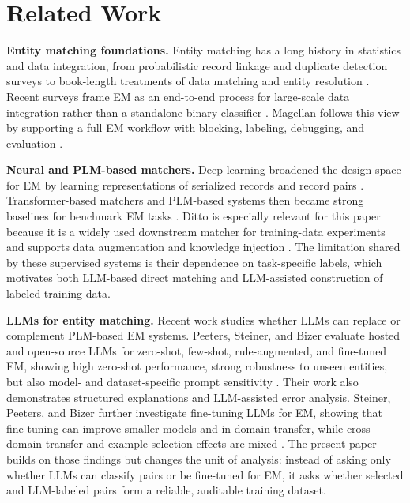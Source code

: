\section{Related Work}

\textbf{Entity matching foundations.} Entity matching has a long history in statistics and data integration, from probabilistic record linkage \cite{fellegi1969record} and duplicate detection surveys \cite{elmagarmid2007duplicate} to book-length treatments of data matching and entity resolution \cite{christen2012data,christophides2015webdata}. Recent surveys frame EM as an end-to-end process for large-scale data integration rather than a standalone binary classifier \cite{christophides2020overview}. Magellan follows this view by supporting a full EM workflow with blocking, labeling, debugging, and evaluation \cite{konda2016magellan}.

\textbf{Neural and PLM-based matchers.} Deep learning broadened the design space for EM by learning representations of serialized records and record pairs \cite{mudgal2018deep,barlaug2021survey}. Transformer-based matchers and PLM-based systems then became strong baselines for benchmark EM tasks \cite{brunner2020transformer,li2020ditto}. Ditto is especially relevant for this paper because it is a widely used downstream matcher for training-data experiments and supports data augmentation and knowledge injection \cite{li2020ditto}. The limitation shared by these supervised systems is their dependence on task-specific labels, which motivates both LLM-based direct matching and LLM-assisted construction of labeled training data.

\textbf{LLMs for entity matching.} Recent work studies whether LLMs can replace or complement PLM-based EM systems. Peeters, Steiner, and Bizer evaluate hosted and open-source LLMs for zero-shot, few-shot, rule-augmented, and fine-tuned EM, showing high zero-shot performance, strong robustness to unseen entities, but also model- and dataset-specific prompt sensitivity \cite{peeters2025llmem}. Their work also demonstrates structured explanations and LLM-assisted error analysis. Steiner, Peeters, and Bizer further investigate fine-tuning LLMs for EM, showing that fine-tuning can improve smaller models and in-domain transfer, while cross-domain transfer and example selection effects are mixed \cite{steiner2025finetuning}. The present paper builds on those findings but changes the unit of analysis: instead of asking only whether LLMs can classify pairs or be fine-tuned for EM, it asks whether selected and LLM-labeled pairs form a reliable, auditable training dataset.

